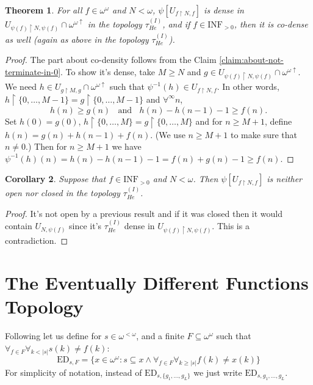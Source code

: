 \documentclass[12pt]{amsart}
\theoremstyle{plain}
\newtheorem{theorem}{Theorem}[section]
\newtheorem{corollary}[theorem]{Corollary}
\theoremstyle{definition}
\theoremstyle{remark}
\newcommand{\baire}{\omega^{\omega}}
\newcommand{\finbaire}{\omega^{<\omega}}
\newcommand{\incrbaire}{\omega^{\omega \uparrow}}
\newcommand{\inversepsi}{\psi^{-1}}
\newcommand{\oo}{\omega}
\newcommand{\Hechler}[2]{U_{#1,#2}}
\newcommand{\EventuallyDifferent}[2]{\mathrm{ED}_{#1,#2}}
\newcommand{\HechlerInduced}{\tau_{\mathit{He}}^{(I)}}
\newcommand{\INFNonZero}{\mathrm{INF}_{>0}}
\begin{document}
\begin{theorem}\label{theorem:dense-co-dense-Hechler}
For all $f\in\baire$ and $N <\oo$, 
$\psi[\Hechler{f\restriction N}{f}]$ is dense in $\Hechler{\psi(f)\restriction N}{\psi(f)} \cap \incrbaire$
in the topology $\HechlerInduced$,
and if $f \in \INFNonZero$, then it is
co-dense as well (again as above in the topology $\HechlerInduced$).
\end{theorem}
\begin{proof}
  The part about co-density follows from the Claim \ref{claim:about-not-terminate-in-0}.
To show it's dense,
take $M \ge N$ and $g\in \Hechler{\psi(f)\restriction N}{\psi(f)} \cap \incrbaire$.
We need $h\in \Hechler{g\restriction M}{g}\cap\incrbaire$ such that 
$\inversepsi(h) \in \Hechler{f\restriction N}{f}$.
In other words,
$h\restriction \lbrace 0, \ldots, M - 1\rbrace = g\restriction \lbrace 0, \ldots, M - 1\rbrace$ and  
$\forall^\infty n$, 
$$
h(n) \ge g(n) \;\;\mbox{  and  }\;\; h(n) - h(n-1) - 1 \ge f(n).
$$
Set $h(0) = g(0)$, 
$h\restriction \lbrace 0, \ldots, M\rbrace =
g\restriction \lbrace 0, \ldots, M\rbrace$ and for $n \ge M + 1$, define  
$h(n) = g(n) + h(n-1) + f(n)$.
(We use $n\ge M+1$ to make sure that $n\not=0$.) 
Then for $n\ge M+1$ we have 
$\inversepsi(h)(n) = h(n) - h(n-1) - 1 = f(n) + g(n) - 1 \ge f(n)$.
\end{proof}

\begin{corollary}
Suppose that $f\in \INFNonZero$ and $N<\oo$. Then
$\psi[\Hechler{f\restriction N}{f}]$ is neither open nor closed
in the topology $\HechlerInduced$.
\end{corollary}
\begin{proof}
It's not open by a previous result and if 
it was closed then it would contain $\Hechler{N}{\psi(f)}$ since it's $\HechlerInduced$ dense
in $\Hechler{\psi(f)\restriction N}{\psi(f)}$.
This is a contradiction.
\end{proof}

\section{The Eventually Different Functions Topology}

Following \cite{Labedzki1996} let us define for $s \in \finbaire$,
and a finite $F \subseteq \baire$ such that
$\forall_{f \in F} \forall_{k < |s|} s(k) \not= f(k)$:
\[\EventuallyDifferent{s}{F} =
\lbrace x \in \baire\colon
s \subseteq x \wedge \forall_{f \in F} \forall_{k \geq |s|} f(k) \not= x(k)\rbrace\]
For simplicity of notation, instead of
$\EventuallyDifferent{s}{\lbrace g_1, \ldots, g_L\rbrace}$
we just write 
$\EventuallyDifferent{s}{g_1, \ldots, g_L}$.
\end{document}
